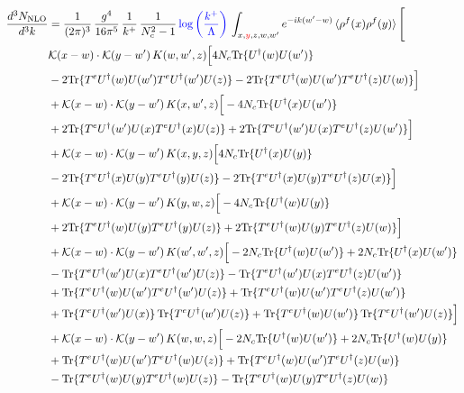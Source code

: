 \documentclass[9pt]{article}
\numberwithin{equation}{section}
\begin{document}
\begin{align}
    \frac{d^{3}N_{\mathrm{NLO}}}{d^{3}k} & = \frac{1}{(2\pi)^{3}}\,\frac{g^{4}}{16\pi^{5}}\,\frac{1}{k^{+}}\,\frac{1}{N^{2}_{c}-1}\,{\color{blue}\log{\left(\frac{k^{+}}{\Lambda}\right)}}\,\int_{x,{\color{red}y},z,w,w'}e^{-ik(w'-w)}\,\langle\rho^{f}(x)\rho^{f}(y) \rangle\,\Bigg[\notag \\ & \mathcal K(x-w)\cdot\mathcal K(y-w')\,K(w,w',z)\Big[4 N_{c}{\rm Tr}\{U^\dagger(w)U(w')\}\notag\\
&-2{\rm Tr}\{T^eU^\dagger(w)U(w')T^eU^\dagger(w')U(z)\}-2{\rm Tr}\{T^eU^\dagger(w)U(w')T^eU^\dagger(z)U(w)\}\Big]\notag\\
&+\mathcal K(x-w)\cdot\mathcal K(y-w')\,K(x,w',z)\Big[-4 N_{c}{\rm Tr}\{U^\dagger(x)U(w')\}\notag\\
&+2{\rm Tr}\{T^eU^\dagger(w')U(x)T^eU^\dagger(x)U(z)\}+2{\rm Tr}\{T^eU^\dagger(w')U(x)T^eU^\dagger(z)U(w')\}\Big]\notag\\
&+\mathcal K(x-w)\cdot\mathcal K(y-w')\,K(x,y,z)\Big[4 N_{c}{\rm Tr}\{U^\dagger(x)U(y)\}\notag\\
&-2{\rm Tr}\{T^eU^\dagger(x)U(y)T^eU^\dagger(y)U(z)\}-2{\rm Tr}\{T^eU^\dagger(x)U(y)T^eU^\dagger(z)U(x)\}\Big]\notag\\
&+\mathcal K(x-w)\cdot\mathcal K(y-w')\,K(y,w,z)\Big[-4 N_{c}{\rm Tr}\{U^\dagger(w)U(y)\}\notag\\
&+2{\rm Tr}\{T^eU^\dagger(w)U(y)T^eU^\dagger(y)U(z)\}+2{\rm Tr}\{T^eU^\dagger(w)U(y)T^eU^\dagger(z)U(w)\}\Big]\notag\\
&+\mathcal K(x-w)\cdot\mathcal K(y-w')\,K(w',w',z)\Big[-2 N_{c}{\rm Tr}\{U^\dagger(w)U(w')\}+2 N_{c}{\rm Tr}\{U^\dagger(x)U(w')\}\notag\\
&-{\rm Tr}\{T^eU^\dagger(w')U(x)T^eU^\dagger(w')U(z)\}-{\rm Tr}\{T^eU^\dagger(w')U(x)T^eU^\dagger(z)U(w')\}\notag\\
&+{\rm Tr}\{T^eU^\dagger(w)U(w')T^eU^\dagger(w')U(z)\}+{\rm Tr}\{T^eU^\dagger(w)U(w')T^eU^\dagger(z)U(w')\}\notag\\
&+{\rm Tr}\{T^eU^\dagger(w')U(x)\}\,{\rm Tr}\{T^eU^\dagger(w')U(z)\}+{\rm Tr}\{T^eU^\dagger(w)U(w')\}\,{\rm Tr}\{T^eU^\dagger(w')U(z)\}\Big]\notag\\
&+\mathcal K(x-w)\cdot\mathcal K(y-w')\,K(w,w,z)\Big[-2 N_{c}{\rm Tr}\{U^\dagger(w)U(w')\}+2 N_{c}{\rm Tr}\{U^\dagger(w)U(y)\}\notag\\
&+{\rm Tr}\{T^eU^\dagger(w)U(w')T^eU^\dagger(w)U(z)\}+{\rm Tr}\{T^eU^\dagger(w)U(w')T^eU^\dagger(z)U(w)\}\notag\\
&-{\rm Tr}\{T^eU^\dagger(w)U(y)T^eU^\dagger(w)U(z)\}-{\rm Tr}\{T^eU^\dagger(w)U(y)T^eU^\dagger(z)U(w)\}\notag\\

\end{align}
\end{document}
